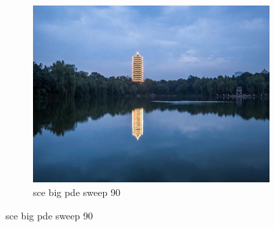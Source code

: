 \documentclass[11pt]{article}
\begin{document}
\begin{figure}[ht!]
\begin{subfigure}[]{0.333\linewidth}
        \centering
        \includegraphics[width=\linewidth]{fig/restoration/sce_big/pde_90.jpg}
        \caption{sce big pde sweep 90}
    \end{subfigure}%
\end{figure}
\end{document}
